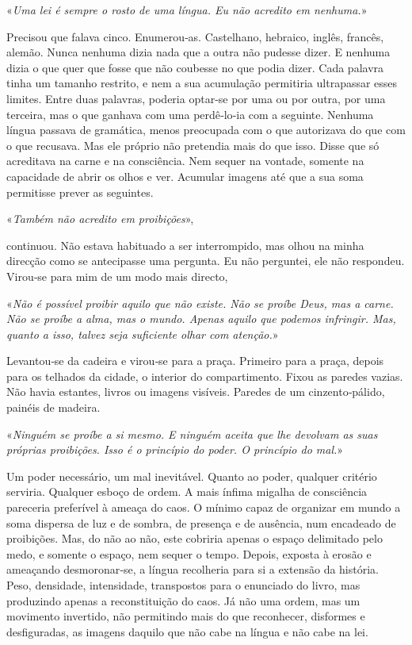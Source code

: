 «\emph{Uma lei é sempre o rosto de uma língua. Eu não acredito em
nenhuma.}»

Precisou que falava cinco. Enumerou­‑as. Castelhano, hebraico, inglês,
francês, alemão. Nunca nenhuma dizia nada que a outra não pudesse dizer.
E nenhuma dizia o que quer que fosse que não coubesse no que podia
dizer. Cada palavra tinha um tamanho restrito, e nem a sua acumulação
permitiria ultrapassar esses limites. Entre duas palavras, poderia
optar­‑se por uma ou por outra, por uma terceira, mas o que ganhava com
uma perdê­‑lo­‑ia com a seguinte. Nenhuma língua passava de gramática,
menos preocupada com o que autorizava do que com o que recusava. Mas ele
próprio não pretendia mais do que isso. Disse que só acreditava na carne
e na consciência. Nem sequer na vontade, somente na capacidade de abrir
os olhos e ver. Acumular imagens até que a sua soma permitisse prever as
seguintes.

«\emph{Também não acredito em proibições}»,

continuou. Não estava habituado a ser interrompido, mas olhou na minha
direcção como se antecipasse uma pergunta. Eu não perguntei, ele não
respondeu. Virou­‑se para mim de um modo mais directo,

«\emph{Não é possível proibir aquilo que não existe. Não se proíbe Deus,
mas a carne. Não se proíbe a alma, mas o mundo. Apenas aquilo que
podemos infringir. Mas, quanto a isso, talvez seja suficiente olhar com
atenção.}»

Levantou­‑se da cadeira e virou­‑se para a praça. Primeiro para a praça,
depois para os telhados da cidade, o interior do compartimento. Fixou as
paredes vazias. Não havia estantes, livros ou imagens visíveis. Paredes
de um cinzento­‑pálido, painéis de madeira.

«\emph{Ninguém se proíbe a si mesmo. E ninguém aceita que lhe devolvam
as suas próprias proibições. Isso é o princípio do poder. O princípio do
mal.}»

Um poder necessário, um mal inevitável. Quanto ao poder, qualquer
critério serviria. Qualquer esboço de ordem. A mais ínfima migalha de
consciência pareceria preferível à ameaça do caos. O mínimo capaz de
organizar em mundo a soma dispersa de luz e de sombra, de presença e de
ausência, num encadeado de proibições. Mas, do não ao não, este cobriria
apenas o espaço delimitado pelo medo, e somente o espaço, nem sequer o
tempo. Depois, exposta à erosão e ameaçando desmoronar­‑se, a língua
recolheria para si a extensão da história. Peso, densidade, intensidade,
transpostos para o enunciado do livro, mas produzindo apenas a
reconstituição do caos. Já não uma ordem, mas um movimento invertido,
não permitindo mais do que reconhecer, disformes e desfiguradas, as
imagens daquilo que não cabe na língua e não cabe na lei.

